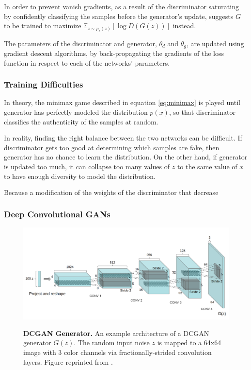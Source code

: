 \documentclass{article}
\begin{document}
In order to prevent vanish gradients, as a result of the discriminator saturating by confidently classifying the samples before the generator's update, \cite{goodfellow_generative_2014} suggests $G$ to be trained to maximize $\mathbb{E}_{z \sim p_{z}(z)}[\log D(G(z))]$ instead.

The parameters of the discriminator and generator, $\theta_{d}$ and $\theta_{g}$, are updated using gradient descent algorithms, by back-propagating the gradients of the loss function in respect to each of the networks' parameters. 


\subsubsection{Training Difficulties}
In theory, the minimax game described in equation \ref{eq:minimax} is played until generator has perfectly modeled the distribution $p(x)$, so that discriminator classifies the authenticity of the samples at random. 

In reality, finding the right balance between the two networks can be difficult. If discriminator gets too good at determining which samples are fake, then generator has no chance to learn the distribution. On the other hand, if generator is updated too much, it can collapse too many values of $z$ to the same value of $x$ to have enough diversity to model the distribution. 

Because a modification of the weights of the discriminator that decrease 

\subsubsection{Deep Convolutional GANs} \label{sec:dcgan}

\begin{figure}[h]
\centering
{\includegraphics[width=\linewidth]{GAN/dcgan_generator}}
\caption{\label{fig:dcgan} \textbf{DCGAN Generator.} An example architecture of a DCGAN generator $G(z)$. The random input noise $z$ is mapped to a 64x64 image with 3 color channels via fractionally-strided convolution layers. Figure reprinted from \cite{radford_unsupervised_2015}.}
\end{figure}
\end{document}
